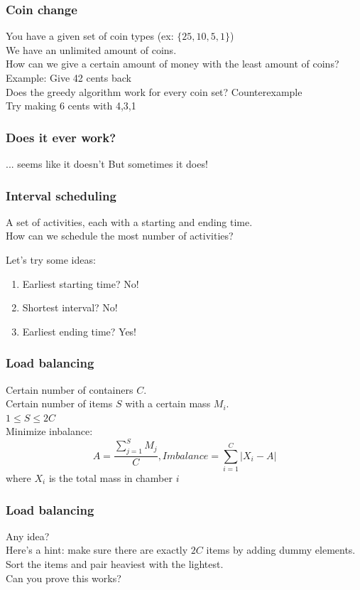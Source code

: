 \documentclass[12pt]{beamer}
\newcommand{\blank}{\vspace{.5cm}}
\begin{document}
\begin{frame}
	\frametitle{Coin change}
	You have a given set of coin types (ex: $\{25,10,5,1\}$)\\
	We have an unlimited amount of coins.\\
	How can we give a certain amount of money with the least amount of coins?\\
	Example: Give 42 cents back
	\\\blank Does the greedy algorithm work for every coin set? Counterexample\\\blank
	Try making 6 cents with {4,3,1}
\end{frame}

\begin{frame}
	\frametitle{Does it ever work?}
	\pause
	... seems like it doesn't\vfill
	\pause
	But sometimes it does!
\end{frame}

\begin{frame}
	\frametitle{Interval scheduling}
	A set of activities, each with a starting and ending time.\\
	How can we schedule the most number of activities?\\\blank
	
	Let's try some ideas:
	\begin{enumerate}
		\item Earliest starting time? \pause \color{red}No!\color{black}\pause
		\item Shortest interval? \pause \color{red}No!\color{black}\pause
		\item Earliest ending time? \pause \color{green}Yes!\color{black}
	\end{enumerate}
\end{frame}

\begin{frame}
	\frametitle{Load balancing}
	Certain number of containers $C$.\\
	Certain number of items $S$ with a certain mass $M_i$.\\
	$1 \leq S \leq 2C$\\
	Minimize inbalance:\\ 
	$$A = \frac{\sum_{j=1}^{S}M_j}{C}, 
	Imbalance = \sum_{i=1}^{C} |X_i - A|$$
	where $X_i$ is the total mass in chamber $i$
\end{frame}

\begin{frame}
	\frametitle{Load balancing}
	Any idea?\\\blank\pause
	Here's a hint: make sure there are exactly $2C$ items by adding dummy elements.\\\blank\pause
	Sort the items and pair heaviest with the lightest.\\\blank
	Can you prove this works?
\end{frame}
\end{document}
